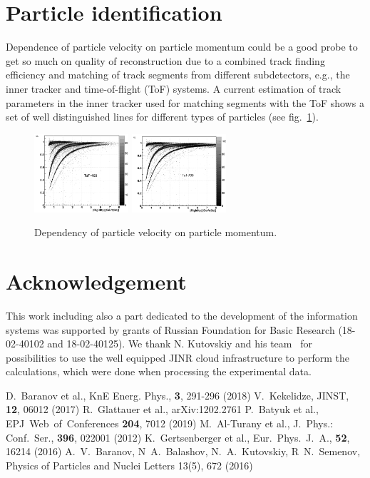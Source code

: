 \documentclass{webofc}
\begin{document}
\section{Particle identification}
\label{sec-4}
Dependence of particle velocity on particle momentum could be a good probe to get so much on quality of reconstruction due to a combined track finding efficiency and matching
of track segments from different subdetectors, e.g., the inner tracker and time-of-flight (ToF) systems. A current estimation of track parameters in the inner tracker used for matching segments with
the ToF shows a set of well distinguished lines for different types of particles (see fig.~\ref{fig-6}).
\begin{figure}[h]
	\centering
	\includegraphics[width=3.5cm,clip]{pid_tof400_sim}
	\includegraphics[width=3.5cm,clip]{pid_tof700_sim}
	\caption{Dependency of particle velocity on particle momentum.}
	\label{fig-6}
\end{figure}

\section{Acknowledgement}
This work including also a part dedicated to the development of the information systems was supported by grants of
Russian Foundation for Basic Research (18-02-40102 and 18-02-40125). We thank N. Kutovskiy and his team~\cite{jinrCloud} for possibilities to use the well equipped JINR cloud infrastructure
to perform the calculations, which were done when processing the experimental data.

\begin{thebibliography}{}
		
	 D.~Baranov et al., KnE Energ. Phys., \textbf{3}, 291-296 (2018)
	 V.~Kekelidze, JINST, \textbf{12}, 06012 (2017)
	 R.~Glattauer et al., arXiv:1202.2761
	 P.~Batyuk et al., EPJ~Web~of~Conferences \textbf{204}, 7012 (2019)
	 M.~Al-Turany et al., J.~Phys.: Conf.~Ser., \textbf{396}, 022001 (2012)
	 K.~Gertsenberger et al., Eur.~Phys.~J.~A., \textbf{52}, 16214 (2016)
         A.~V.~Baranov, N~A.~Balashov, N.~A.~Kutovskiy, R~N.~Semenov, Physics of Particles and Nuclei Letters 13(5), 672 (2016)
	
\end{thebibliography}
\end{document}
